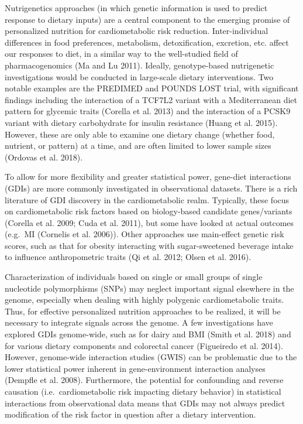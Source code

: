 \documentclass[]{article}
\begin{document}
Nutrigenetics approaches (in which genetic information is used to
predict response to dietary inputs) are a central component to the
emerging promise of personalized nutrition for cardiometabolic risk
reduction. Inter-individual differences in food preferences, metabolism,
detoxification, excretion, etc. affect our responses to diet, in a
similar way to the well-studied field of pharmacogenomics (Ma and Lu
2011). Ideally, genotype-based nutrigenetic investigations would be
conducted in large-scale dietary interventions. Two notable examples are
the PREDIMED and POUNDS LOST trial, with significant findings including
the interaction of a TCF7L2 variant with a Mediterranean diet pattern
for glycemic traits (Corella et al. 2013) and the interaction of a PCSK9
variant with dietary carbohydrate for insulin resistance (Huang et al.
2015). However, these are only able to examine one dietary change
(whether food, nutrient, or pattern) at a time, and are often limited to
lower sample sizes (Ordovas et al. 2018).

To allow for more flexibility and greater statistical power, gene-diet
interactions (GDIs) are more commonly investigated in observational
datasets. There is a rich literature of GDI discovery in the
cardiometabolic realm. Typically, these focus on cardiometabolic risk
factors based on biology-based candidate genes/variants (Corella et al.
2009; Cuda et al. 2011), but some have looked at actual outcomes
(e.g.~MI (Cornelis et al. 2006)). Other approaches use main-effect
genetic risk scores, such as that for obesity interacting with
sugar-sweetened beverage intake to influence anthropometric traits (Qi
et al. 2012; Olsen et al. 2016).

Characterization of individuals based on single or small groups of
single nucleotide polymorphisms (SNPs) may neglect important signal
elsewhere in the genome, especially when dealing with highly polygenic
cardiometabolic traits. Thus, for effective personalized nutrition
approaches to be realized, it will be necessary to integrate signals
across the genome. A few investigations have explored GDIs genome-wide,
such as for dairy and BMI (Smith et al. 2018) and for various dietary
components and colorectal cancer (Figueiredo et al. 2014). However,
genome-wide interaction studies (GWIS) can be problematic due to the
lower statistical power inherent in gene-environment interaction
analyses (Dempfle et al. 2008). Furthermore, the potential for
confounding and reverse causation (i.e.~cardiometabolic risk impacting
dietary behavior) in statistical interactions from observational data
means that GDIs may not always predict modification of the risk factor
in question after a dietary intervention.
\end{document}
